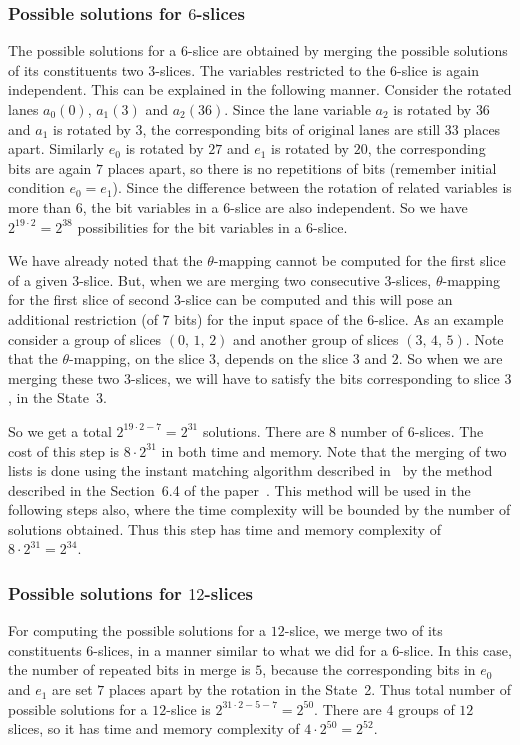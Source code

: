 \documentclass[runningheads]{llncs}
\begin{document}
\subsubsection{Possible solutions for  $6$-slices} 
The possible solutions for a $6$-slice are obtained by merging the possible solutions of its constituents two $3$-slices. The variables restricted to the $6$-slice is again independent. This can be explained in the following manner. Consider the rotated lanes $a_0(0)$, $a_1(3)$ and $a_2(36)$. Since the lane variable $a_2$ is rotated by $36$ and $a_1$ is rotated by $3$, the corresponding bits of original lanes are still $33$ places apart. Similarly $e_0$ is rotated by $27$ and $e_1$ is rotated by $20$, the corresponding bits are again $7$ places apart, so there is no repetitions of bits (remember initial condition $e_0 = e_1$). Since the difference between the rotation of related variables is more than $6$, the bit variables in a $6$-slice are also independent.
So we have $2^{19\cdot 2}= 2^{38}$ possibilities for the bit variables in a $6$-slice. 

We have already noted that the $\theta$-mapping cannot be computed for the first slice of a given $3$-slice. But, when we are merging two consecutive $3$-slices, $\theta$-mapping for the first slice of second $3$-slice can be computed and this will pose an additional restriction (of $7$ bits) for the input space of the $6$-slice.
As an example consider a group of slices $(0,\,1,\,2)$ and another group of slices $(3,\,4,\,5)$. Note that the $\theta$-mapping, on the slice $3$, depends on the slice $3$ and $2$. So when we are merging these two $3$-slices, we will have to satisfy the bits corresponding to slice $3$, in the State~3. 

So we get a total $2^{19\cdot 2 - 7} = 2^{31}$ solutions. There are $8$ number of $6$-slices.
The cost of this step is $8 \cdot 2^{31}$ in both time and memory. Note that the merging of two lists is done using the instant matching
algorithm described in~\cite{naya2011improve} by the method described in the Section~6.4 of the paper~\cite{naya2011practical}. This method will be used in the following steps also, where the time complexity will be bounded by the number of solutions obtained. Thus this step has time and memory complexity of $8 \cdot 2^{31} = 2^{34}$.

\subsubsection{Possible solutions for $12$-slices} 
For computing the possible solutions for a $12$-slice, we merge two of its constituents $6$-slices, in a manner similar to what we did for a $6$-slice. In this case, the number of repeated bits in merge is $5$, because the corresponding bits in $e_0$ and $e_1$ are set $7$ places apart by the rotation in the State~2. Thus total number of possible solutions for a $12$-slice is $2^{31 \cdot 2 - 5 - 7} = 2^{50}$. There are $4$ groups of $12$ slices, so it has time and memory complexity of $4 \cdot 2^{50} = 2^{52}$.
\end{document}
